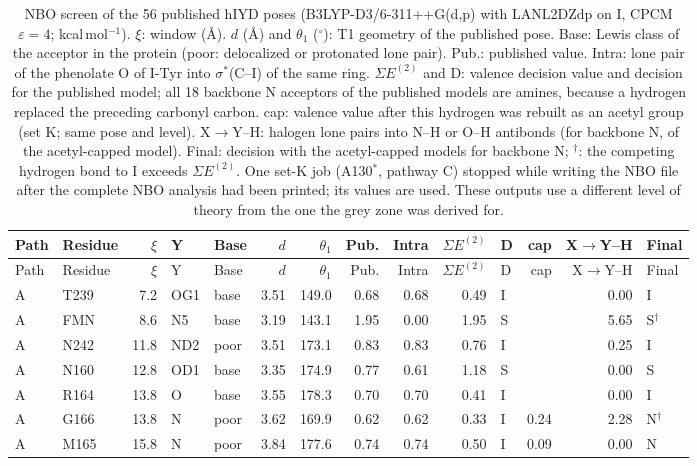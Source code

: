 {\scriptsize
\setlength{\tabcolsep}{3pt}
\begin{longtable}{llrllrrrrrlrrl}
\caption{NBO screen of the 56 published hIYD poses (B3LYP-D3/6-311++G(d,p) with LANL2DZdp on I, CPCM $\varepsilon=4$; kcal\,mol$^{-1}$).\cite{Karmakar2026} $\xi$: window (\AA). $d$ (\AA) and $\theta_1$ ($^\circ$): T1 geometry of the published pose. Base: Lewis class of the acceptor in the protein (poor: delocalized or protonated lone pair). Pub.: published value. Intra: lone pair of the phenolate O of I-Tyr into $\sigma^*$(C--I) of the same ring. $\Sigma E^{(2)}$ and D: valence decision value and decision for the published model; all 18 backbone N acceptors of the published models are amines, because a hydrogen replaced the preceding carbonyl carbon. cap: valence value after this hydrogen was rebuilt as an acetyl group (set K; same pose and level). X$\to$Y--H: halogen lone pairs into N--H or O--H antibonds (for backbone N, of the acetyl-capped model). Final: decision with the acetyl-capped models for backbone N; $^\dagger$: the competing hydrogen bond to I exceeds $\Sigma E^{(2)}$. One set-K job (A130$^*$, pathway C) stopped while writing the NBO file after the complete NBO analysis had been printed; its values are used. These outputs use a different level of theory from the one the grey zone was derived for.}\label{tab:hiydnbo}\\
\toprule
Path & Residue & $\xi$ & Y & Base & $d$ & $\theta_1$ & Pub. & Intra & $\Sigma E^{(2)}$ & D & cap & X$\to$Y--H & Final\\
\midrule
\endfirsthead
\toprule
Path & Residue & $\xi$ & Y & Base & $d$ & $\theta_1$ & Pub. & Intra & $\Sigma E^{(2)}$ & D & cap & X$\to$Y--H & Final\\
\midrule
\endhead
\bottomrule
\endlastfoot
A & T239 & 7.2 & OG1 & base & 3.51 & 149.0 & 0.68 & 0.68 & 0.49 & I &  & 0.00 & I\\
A & FMN & 8.6 & N5 & base & 3.19 & 143.1 & 1.95 & 0.00 & 1.95 & S &  & 5.65 & S$^\dagger$\\
A & N242 & 11.8 & ND2 & poor & 3.51 & 173.1 & 0.83 & 0.83 & 0.76 & I &  & 0.25 & I\\
A & N160 & 12.8 & OD1 & base & 3.35 & 174.9 & 0.77 & 0.61 & 1.18 & S &  & 0.00 & S\\
A & R164 & 13.8 & O & base & 3.55 & 178.3 & 0.70 & 0.70 & 0.41 & I &  & 0.00 & I\\
A & G166 & 13.8 & N & poor & 3.62 & 169.9 & 0.62 & 0.62 & 0.33 & I & 0.24 & 2.28 & N$^\dagger$\\
A & M165 & 15.8 & N & poor & 3.84 & 177.6 & 0.74 & 0.74 & 0.50 & I & 0.09 & 0.00 & N\\

\end{longtable}}
